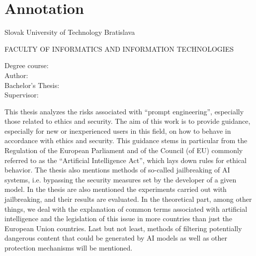 \thispagestyle{empty}

\section*{Annotation}

\begin{minipage}[t]{1\columnwidth}%
Slovak University of Technology Bratislava

FACULTY OF INFORMATICS AND INFORMATION TECHNOLOGIES

Degree course: \hspace{1.4cm} \myStudyProgramEN\\

\noindent
Author: \hspace{2.6cm} \myName \\
Bachelor's Thesis: \hspace{0.75cm} \myTitleEN \\
Supervisor: \hspace{2cm} \mySupervisor \\
\noindent
\myDateEN%
\end{minipage}

\bigskip{}

This thesis analyzes the risks associated with ``prompt engineering'', especially those related to ethics and security. The aim of this work is to provide guidance, especially for new or inexperienced users in this field, on how to behave in accordance with ethics and security. This guidance stems in particular from the Regulation of the European Parliament and of the Council (of EU) commonly referred to as the ``Artificial Intelligence Act'', which lays down rules for ethical behavior. The thesis also mentions methods of so-called jailbreaking of AI systems, i.e. bypassing the security measures set by the developer of a given model. In the thesis are also mentioned the experiments carried out with jailbreaking, and their results are evaluated. In the theoretical part, among other things, we deal with the explanation of common terms associated with artificial intelligence and the legislation of this issue in more countries than just the European Union countries. Last but not least, methods of filtering potentially dangerous content that could be generated by AI models as well as other protection mechanisms will be mentioned.

\newpage{}\thispagestyle{empty}\medskip{}


\newpage{}

\newpage
\thispagestyle{empty}
\mbox{}
\newpage
